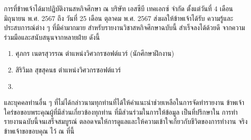 \begin{acknowledgments}
    การที่ข้าพเจ้าได้มาปฏิบัติงานสหกิจศึกษา ณ บริษัท เอสซีบี เทคเอกซ์ จำกัด ตั้งแต่วันที่ 4 เดือน มิถุนายน
     พ.ศ. 2567 ถึง วันที่ 25 เดือน ตุลาคม พ.ศ. 2567 ส่งผลให้ข้าพเจ้าได้รับ
    ความรู้และประสบการณ์ต่าง ๆ ที่มีค่ามากมาย สำหรับรายงานวิชาสหกิจศึกษาฉบับนี้ สำเร็จลงได้ด้วยดี
    จากความร่วมมือและสนับสนุนจากหลายฝ่าย ดังนี้
    \begin{enumerate}
        \item ศุภกร เนตรสุวรรณ ตำแหน่งวิศวกรซอฟต์แวร์ (นักศึกษาฝึกงาน)
        \item สิริวิมล สุขสุคนธ ตำแหน่งวิศวกรซอฟต์แวร์
        \item 
    \end{enumerate}
    และบุคคลท่านอื่น ๆ ที่ไม่ได้กล่าวนามทุกท่านที่ได้ให้คำแนะนำช่วยเหลือในการจัดทำรายงาน
    ข้าพเจ้าใคร่ขอขอบพระคุณผู้ที่มีส่วนเกี่ยวข้องทุกท่าน ที่มีส่วนร่วมในการให้ข้อมูล เป็นที่ปรึกษาใน
    การทำรายงานฉบับนี้จนเสร็จสมบูรณ์ ตลอดจนให้การดูแลและให้ความเข้าใจเกี่ยวกับชีวิตของการทำงาน
    จริง ข้าพเจ้าขอขอบคุณ ไว้ ณ ที่นี้

\end{acknowledgments}%
\fi %

\contentspage

\ifproject
\figurelistpage
\tablelistpage
\fi %



